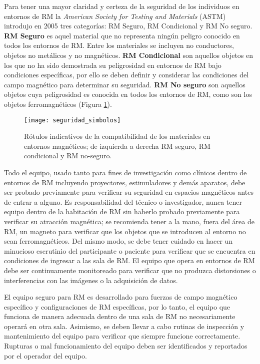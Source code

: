 Para tener una mayor claridad y certeza de la seguridad de los individuos en entornos de RM la \emph{American Society for Testing and Materials} (ASTM) introdujo en 2005 tres categorías: RM Seguro, RM Condicional y RM No seguro. \textbf{RM Seguro} es aquel material que no representa ningún peligro conocido en todos los entornos de RM. Entre los materiales se incluyen no conductores, objetos no metálicos y no magnéticos. \textbf{RM Condicional} son aquellos objetos en los que no ha sido demostrada su peligrosidad en entornos de RM bajo condiciones específicas, por ello se deben definir y considerar las condiciones del campo magnético para determinar su seguridad. \textbf{RM No seguro} son aquellos objetos cuya peligrosidad es conocida en todos los entornos de RM, como son los objetos ferromagnéticos (Figura \ref{fig:seguridad_simbolos}).



\begin{figure}[htb]
\begin{figg}
   \texttt{[image: seguridad\_simbolos]}
   \caption{Rótulos indicativos de la compatibilidad de los materiales en entornos magnéticos; de izquierda a derecha RM seguro, RM condicional y RM no-seguro.}
 \label{fig:seguridad_simbolos}
 \end{figg}
\end{figure}






Todo el equipo, usado tanto para fines de investigación como clínicos dentro de entornos de RM incluyendo proyectores, estimuladores y demás aparatos, debe ser probado previamente para verificar su seguridad en espacios magnéticos antes de entrar a alguno. Es responsabilidad del técnico o investigador, nunca tener equipo dentro de la habitación de RM sin haberlo probado previamente para verificar su atracción magnética; se recomienda tener a la mano, fuera del área de RM, un magneto para verificar que los objetos que se introducen al entorno no sean ferromagnéticos. Del mismo modo, se debe tener cuidado en hacer un minucioso escrutinio del participante o paciente para verificar que se encuentra en condiciones de ingresar a las sala de RM. El equipo que opera en entornos de RM debe ser continuamente monitoreado para verificar que no produzca distorsiones o interferencias con las imágenes o la adquisición de datos.  

El equipo seguro para RM  es desarrollado para fuerzas de campo magnético específico y configuraciones de RM específicas, por lo tanto, el equipo que funciona de manera adecuada dentro de una sala de RM no necesariamente operará en otra sala. Asimismo, se deben llevar a cabo rutinas de inspección y mantenimiento del equipo para verificar que siempre funcione correctamente. Rupturas o mal funcionamiento del equipo deben ser identificados y reportados por el operador del equipo.

